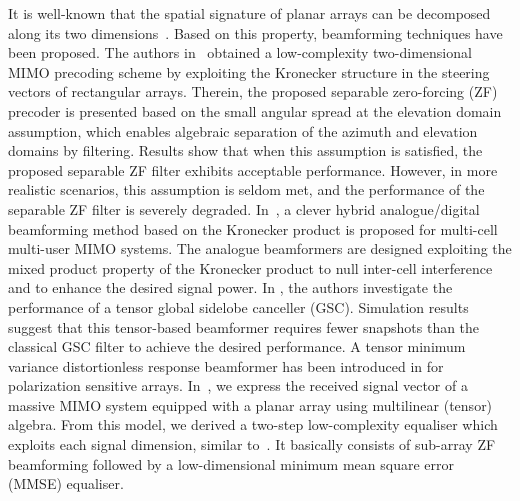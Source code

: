 \documentclass{cta-author}
\begin{document}
It is well-known that the spatial signature of planar arrays can be decomposed along its two dimensions~\cite{van_trees_optimum_2002}. Based on this property, beamforming techniques have been proposed. The authors in~\cite{wang_two-dimensional_2017_top} obtained a low-complexity two-dimensional MIMO precoding scheme by exploiting the Kronecker structure in the steering vectors of rectangular arrays. Therein, the proposed separable zero-forcing (ZF) precoder is presented based on the small angular spread at the elevation domain assumption, which enables algebraic separation of the azimuth and elevation domains by filtering. Results show that when this assumption is satisfied, the proposed separable ZF filter exhibits acceptable performance. However, in more realistic scenarios, this assumption is seldom met, and the performance of the separable ZF filter is severely degraded. In~\cite{zhu2017hybrid}, a clever hybrid analogue/digital beamforming method based on the Kronecker product is proposed for multi-cell multi-user MIMO systems. The analogue beamformers are designed exploiting the mixed product property of the Kronecker product to null inter-cell interference and to enhance the desired signal power. In \cite{miranda_generalized_2015}, the authors investigate the performance of a tensor global sidelobe canceller (GSC). Simulation results suggest that this tensor-based beamformer requires fewer snapshots than the classical GSC filter to achieve the desired performance. A tensor minimum variance distortionless response beamformer has been introduced in \cite{liu2018robust} for polarization sensitive arrays. In~\cite{ribeiro_low-complexity_nodate}, we express the received signal vector of a massive MIMO system equipped with a planar array using multilinear (tensor) algebra. From this model, we derived a two-step low-complexity equaliser which exploits each signal dimension, similar to~\cite{wang_two-dimensional_2017_top}. It basically consists of sub-array ZF beamforming followed by a low-dimensional minimum mean square error (MMSE) equaliser.
\end{document}
